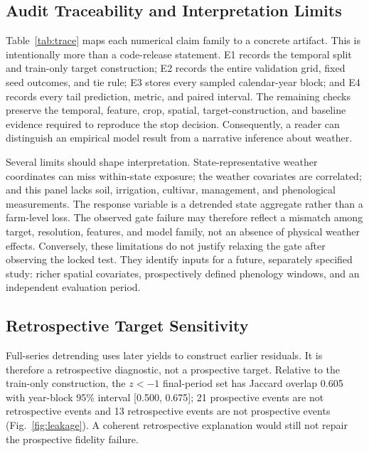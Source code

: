 \documentclass[conference]{IEEEtran}
\begin{document}
\begin{table}[t]
\centering
\caption{Exact temporal robustness and prefix learning-curve checks. Each entry
compares the locked weather-only configuration to zero residual with paired
calendar-year-block 95\% intervals.}
\label{tab:temporalcapacity}
\scriptsize
\resizebox{\textwidth}{!}{}
\end{table}

\subsection{Audit Traceability and Interpretation Limits}
Table~\ref{tab:trace} maps each numerical claim family to a concrete artifact.
This is intentionally more than a code-release statement. E1 records the temporal
split and train-only target construction; E2 records the entire validation grid,
fixed seed outcomes, and tie rule; E3 stores every sampled calendar-year block;
and E4 records every tail prediction, metric, and paired interval. The remaining
checks preserve the temporal, feature, crop, spatial, target-construction, and
baseline evidence required to reproduce the stop decision. Consequently, a reader
can distinguish an empirical model result from a narrative inference about weather.

\begin{table}[t]
\centering
\caption{E1--E10 numerical traceability. VERIFIED means the evidence artifact
was regenerated and checked; it does not mean a scientific gate passed.}
\label{tab:trace}
\scriptsize
\resizebox{\columnwidth}{!}{}
\end{table}

Several limits should shape interpretation. State-representative weather
coordinates can miss within-state exposure; the weather covariates are correlated;
and this panel lacks soil, irrigation, cultivar, management, and phenological
measurements. The response variable is a detrended state aggregate rather than a
farm-level loss. The observed gate failure may therefore reflect a mismatch among
target, resolution, features, and model family, not an absence of physical weather
effects. Conversely, these limitations do not justify relaxing the gate after
observing the locked test. They identify inputs for a future, separately specified
study: richer spatial covariates, prospectively defined phenology windows, and an
independent evaluation period.

\subsection{Retrospective Target Sensitivity}
Full-series detrending uses later yields to construct earlier residuals. It is
therefore a retrospective diagnostic, not a prospective target. Relative to the
train-only construction, the $z<-1$ final-period set has Jaccard overlap 0.605
with year-block 95\% interval [0.500, 0.675]; 21 prospective events are not
retrospective events and 13 retrospective events are not prospective events
(Fig.~\ref{fig:leakage}). A coherent retrospective explanation would still not
repair the prospective fidelity failure.
\end{document}
